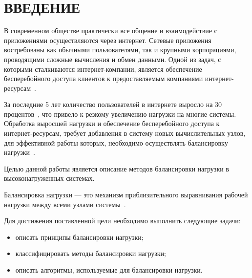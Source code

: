 \chapter*{ВВЕДЕНИЕ}

В современном обществе практически все общение и взаимодействие с приложениями осуществляются через интернет. 
Сетевые приложения востребованы как обычными пользователями, так и крупными корпорациями, проводящими сложные вычисления и обмен данными.
Одной из задач, с которыми сталкиваются интернет-компании, является обеспечение бесперебойного доступа клиентов к предоставляемым компаниями интернет-ресурсам~\cite{webact}.

За последние 5 лет количество пользователей в интернете выросло на 30 процентов~\cite{statistics}, что привело к резкому увеличению нагрузки на многие системы. Обработка выросшей нагрузки и обеспечение бесперебойного доступа к интернет-ресурсам, требует добавления в систему новых вычислительных узлов, для эффективной работы которых, необходимо осуществлять балансировку нагрузки~\cite{strategies, com_analysis, gaud, part_algos}.

Целью данной работы является описание методов балансировки нагрузки в высоконагруженных системах.

Балансировка нагрузки --- это механизм приблизительного выравнивания рабочей нагрузки между всеми узлами системы~\cite{anal}.

Для достижения поставленной цели необходимо выполнить следующие
задачи:
\begin{itemize}
	\item описать принципы балансировки нагрузки;
	\item классифицировать методы балансировки нагрузки;
	\item описать алгоритмы, используемые для балансировки нагрузки.
\end{itemize}

